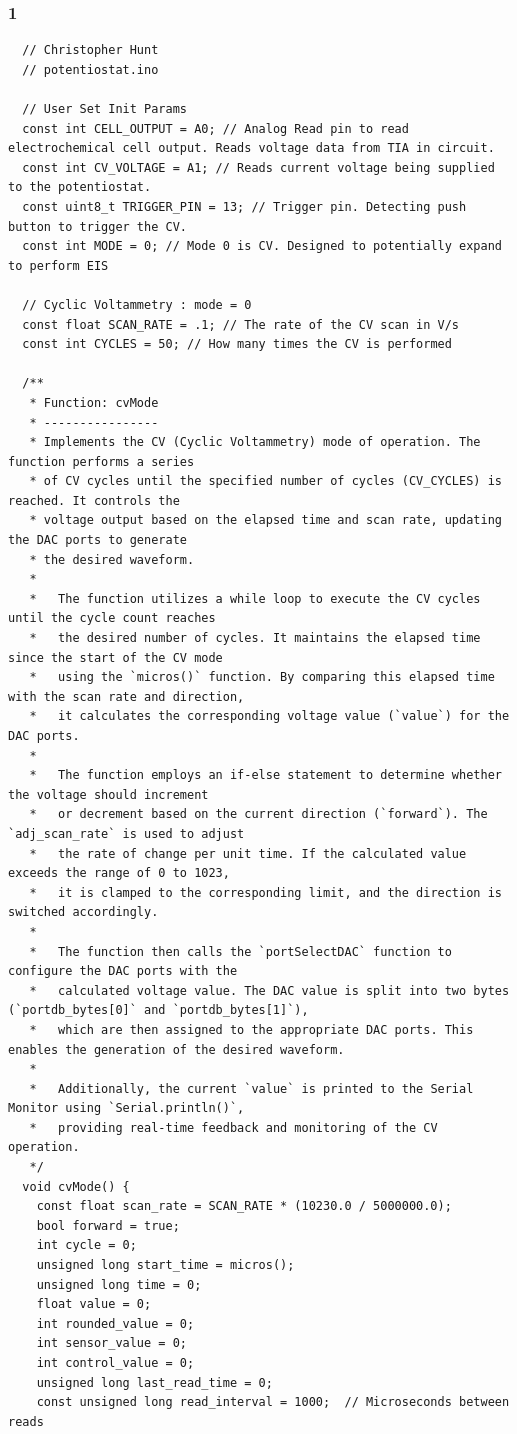\documentclass{article}
\begin{document}
\subsubsection*{1}
\begin{lstlisting}
  // Christopher Hunt
  // potentiostat.ino

  // User Set Init Params
  const int CELL_OUTPUT = A0; // Analog Read pin to read electrochemical cell output. Reads voltage data from TIA in circuit.
  const int CV_VOLTAGE = A1; // Reads current voltage being supplied to the potentiostat.
  const uint8_t TRIGGER_PIN = 13; // Trigger pin. Detecting push button to trigger the CV.
  const int MODE = 0; // Mode 0 is CV. Designed to potentially expand to perform EIS
  
  // Cyclic Voltammetry : mode = 0
  const float SCAN_RATE = .1; // The rate of the CV scan in V/s
  const int CYCLES = 50; // How many times the CV is performed
  
  /**
   * Function: cvMode
   * ----------------
   * Implements the CV (Cyclic Voltammetry) mode of operation. The function performs a series
   * of CV cycles until the specified number of cycles (CV_CYCLES) is reached. It controls the
   * voltage output based on the elapsed time and scan rate, updating the DAC ports to generate
   * the desired waveform.
   *
   *   The function utilizes a while loop to execute the CV cycles until the cycle count reaches
   *   the desired number of cycles. It maintains the elapsed time since the start of the CV mode
   *   using the `micros()` function. By comparing this elapsed time with the scan rate and direction,
   *   it calculates the corresponding voltage value (`value`) for the DAC ports.
   *
   *   The function employs an if-else statement to determine whether the voltage should increment
   *   or decrement based on the current direction (`forward`). The `adj_scan_rate` is used to adjust
   *   the rate of change per unit time. If the calculated value exceeds the range of 0 to 1023,
   *   it is clamped to the corresponding limit, and the direction is switched accordingly.
   *
   *   The function then calls the `portSelectDAC` function to configure the DAC ports with the
   *   calculated voltage value. The DAC value is split into two bytes (`portdb_bytes[0]` and `portdb_bytes[1]`),
   *   which are then assigned to the appropriate DAC ports. This enables the generation of the desired waveform.
   *
   *   Additionally, the current `value` is printed to the Serial Monitor using `Serial.println()`,
   *   providing real-time feedback and monitoring of the CV operation.
   */
  void cvMode() {
    const float scan_rate = SCAN_RATE * (10230.0 / 5000000.0);
    bool forward = true;
    int cycle = 0;
    unsigned long start_time = micros();
    unsigned long time = 0;
    float value = 0;
    int rounded_value = 0;
    int sensor_value = 0;
    int control_value = 0;
    unsigned long last_read_time = 0;
    const unsigned long read_interval = 1000;  // Microseconds between reads
  

\end{lstlisting}
\end{document}
